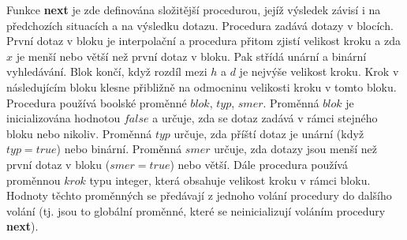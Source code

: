 \documentclass[a4paper,12pt]{article}
\begin{document}
Funkce {\bf next }
je zde definována složitější procedurou, jejíž vý\-sle\-dek 
závisí i na předcho\-zích situacích a na výsledku dotazu.
Procedura zadává dotazy v blocích. První dotaz v bloku je 
interpolační a procedura přitom zjistí velikost kroku a 
zda $x$ je menší nebo větší než první dotaz v bloku.  
Pak střídá unární a binární vy\-hledávání. Blok končí, 
když rozdíl mezi $h$ a $d$ je nejvýše velikost 
kroku. Krok v následujícím bloku klesne 
přibližně na odmoc\-ninu velikosti kroku v tomto bloku. 
Procedura používá boolské pro\-měnné $blok$, $typ$, $
smer$. 
Proměnná $blok$ je inicializována hodnotou $false$ a určuje, 
zda se dotaz zadává v rámci stejného bloku nebo nikoliv. 
Proměnná $typ$ určuje, zda příští dotaz je unární (když 
$typ=true$) nebo binární. Proměnná $smer$ určuje, zda 
dotazy jsou menší než první dotaz v bloku ($smer=tr
ue$) 
nebo větší. Dále procedura používá proměnnou $
krok$ 
typu integer, která obsahuje velikost kroku v rámci 
bloku. Hodnoty těchto pro\-měn\-ných se předávají z jednoho 
volání procedury do dalšího volání (tj. jsou to 
globální proměnné, které se neinicializují voláním 
procedury {\bf next}). 
\end{document}
